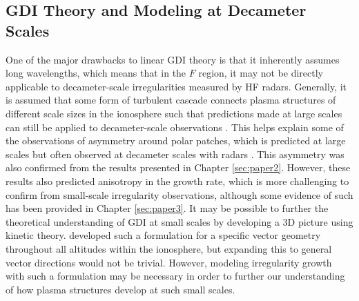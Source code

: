 \subsection{GDI Theory and Modeling at Decameter Scales}
\label{sec:fw_gdi}
One of the major drawbacks to linear GDI theory is that it inherently assumes long wavelengths, which means that in the \(F\) region, it may not be directly applicable to decameter-scale irregularities measured by HF radars.  Generally, it is assumed that some form of turbulent cascade connects plasma structures of different scale sizes in the ionosphere such that predictions made at large scales can still be applied to decameter-scale observations \citep{Tsunoda1988}.  This helps explain some of the observations of asymmetry around polar patches, which is predicted at large scales but often observed at decameter scales with radars \citep[e.g.][]{Milan2002b,Koustov2012}.  This asymmetry was also confirmed from the results presented in Chapter \ref{sec:paper2}.  However, these results also predicted anisotropy in the growth rate, which is more challenging to confirm from small-scale irregularity observations, although some evidence of such has been provided in Chapter \ref{sec:paper3}.  It may be possible to further the theoretical understanding of GDI at small scales by developing a 3D picture using kinetic theory.  \citet{Basu1995} developed such a formulation for a specific vector geometry throughout all altitudes within the ionosphere, but expanding this to general vector directions would not be trivial.  However, modeling irregularity growth with such a formulation may be necessary in order to further our understanding of how plasma structures develop at such small scales.

